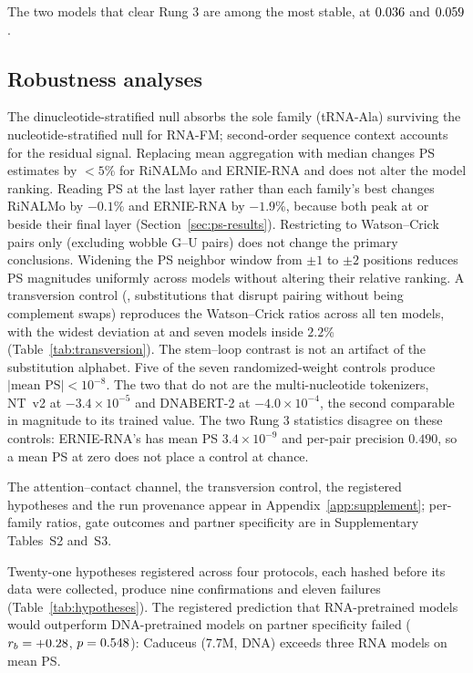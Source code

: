 \documentclass[11pt]{article}
\begin{document}
The two models that clear Rung 3 are among the most stable, at $0.036{}$
and $0.059{}$.

\subsection{Robustness analyses}
\label{sec:robustness}

The dinucleotide-stratified null absorbs the sole family (tRNA-Ala)
surviving the nucleotide-stratified null for RNA-FM; second-order sequence
context accounts for the residual signal. Replacing
mean aggregation with median changes PS estimates by $< 5$\% for RiNALMo
and ERNIE-RNA and does not alter the model ranking. Reading PS at the last
layer rather than each family's best changes RiNALMo by $-0.1$\% and ERNIE-RNA
by $-1.9$\%, because both peak at or beside their final layer
(Section~\ref{sec:ps-results}). Restricting to Watson--Crick pairs only (excluding wobble G--U
pairs) does not change the primary conclusions. Widening the PS neighbor
window from $\pm 1$ to $\pm 2$ positions reduces PS magnitudes uniformly
across models without altering their relative ranking.
A transversion control (\transversionAlphabet{}, substitutions that disrupt
pairing without being complement swaps) reproduces the Watson--Crick ratios
across all ten models, with the widest deviation \transversionWidestDeviation{}
at \transversionWidest{} and seven models inside $2.2$\%
(Table~\ref{tab:transversion}). The stem--loop contrast is not an artifact of
the substitution alphabet. Five of the seven randomized-weight
controls produce $|\text{mean PS}| < 10^{-8}$. The two that do not are the
multi-nucleotide tokenizers, NT~v2 at $-3.4 \times 10^{-5}$ and DNABERT-2 at
$-4.0 \times 10^{-4}$, the second comparable in magnitude to its trained value.
The two Rung 3 statistics disagree on these controls: ERNIE-RNA's has mean PS
$3.4 \times 10^{-9}$ and per-pair precision $0.490$, so a mean PS at zero does
not place a control at chance.

The attention--contact channel, the transversion control, the registered
hypotheses and the run provenance appear in Appendix~\ref{app:supplement};
per-family ratios, gate outcomes and partner specificity are in Supplementary
Tables~S2 and~S3.


Twenty-one hypotheses registered across four protocols, each hashed before its
data were collected, produce nine confirmations and eleven failures
(Table~\ref{tab:hypotheses}). The registered prediction that RNA-pretrained
models would outperform DNA-pretrained models on partner specificity failed
($r_b = +0.28{}$, $p = 0.548{}$): Caduceus (7.7M, DNA) exceeds
three RNA models on mean PS.
\end{document}
